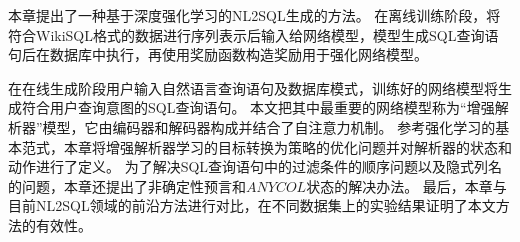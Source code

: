 本章提出了一种基于深度强化学习的NL2SQL生成的方法。
在离线训练阶段，将符合WikiSQL格式的数据进行序列表示后输入给网络模型，模型生成SQL查询语句后在数据库中执行，再使用奖励函数构造奖励用于强化网络模型。

在在线生成阶段用户输入自然语言查询语句及数据库模式，训练好的网络模型将生成符合用户查询意图的SQL查询语句。
本文把其中最重要的网络模型称为“增强解析器”模型，它由编码器和解码器构成并结合了自注意力机制。
参考强化学习的基本范式，本章将增强解析器学习的目标转换为策略的优化问题并对解析器的状态和动作进行了定义。
为了解决SQL查询语句中的过滤条件的顺序问题以及隐式列名的问题，本章还提出了非确定性预言和$ANYCOL$状态的解决办法。
最后，本章与目前NL2SQL领域的前沿方法进行对比，在不同数据集上的实验结果证明了本文方法的有效性。